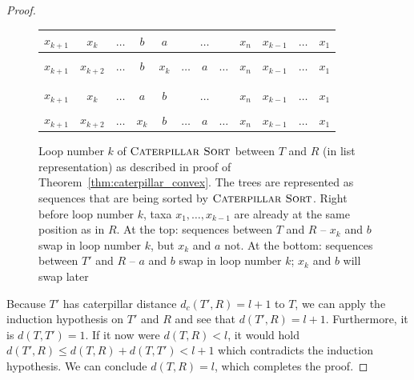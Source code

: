 \documentclass{amsart}
\newcommand{\csort}{\textsc{Caterpillar Sort}}
\begin{document}
\begin{proof}
    \begin{figure}[H]
    	\centering
        \begin{tabular}{|c|c|c|c|c|c|c|c|c|c|c|c|}
            \hline
            $x_{k+1}$ & $x_k$ & $\ldots$ & $b$ & $a$ & \multicolumn{3}{c|}{$\ldots$} & $x_n$ & $x_{k-1}$ & $\ldots$ & $x_1$\\
            \hline
            \multicolumn{12}{c}{}\\
            \hline
            $x_{k+1}$ & $x_{k+2}$ & $\ldots$ & $b$ & $x_k$ & $\ldots$ & $a$ & $\ldots$ & $x_n$ & $x_{k-1}$ & $\ldots$ & $x_1$\\
            \hline
            \multicolumn{12}{c}{}\\
            \multicolumn{12}{c}{}\\
            \hline
            $x_{k+1}$ & $x_k$ & $\ldots$ & $a$ & $b$ & \multicolumn{3}{c|}{$\ldots$} & $x_n$ & $x_{k-1}$ & $\ldots$ & $x_1$\\
            \hline
            \multicolumn{12}{c}{}\\
            \hline
            $x_{k+1}$ & $x_{k+2}$ & $\ldots$ & $x_k$ & $b$ & $\ldots$ & $a$ & $\ldots$ & $x_n$ & $x_{k-1}$ & $\ldots$ & $x_1$\\
            \hline
        \end{tabular}
        \vspace{2pt}
    	\caption{Loop number $k$ of $\csort$ between $T$ and $R$ (in list representation) as described in proof of Theorem~\ref{thm:caterpillar_convex}.
        The trees are represented as sequences that are being sorted by $\csort$.
        Right before loop number $k$, taxa $x_1, \ldots, x_{k-1}$ are already at the same position as in $R$.
        At the top: sequences between $T$ and $R$ -- $x_k$ and $b$ swap in loop number $k$, but $x_k$ and $a$ not.
        At the bottom: sequences between $T'$ and $R$ -- $a$ and $b$ swap in loop number $k$; $x_k$ and $b$ will swap later}
    	\label{fig:cat_convex_seq_example}
    \end{figure}

    Because $T'$ has caterpillar distance $d_c(T',R) = l+1$ to $T$, we can apply the induction hypothesis on $T'$ and $R$ and see that $d(T',R) = l+1$.
    Furthermore, it is $d(T,T') = 1$.
    If it now were $d(T,R) < l$, it would hold $d(T',R) \leq d(T,R) + d(T,T') < l + 1$ which contradicts the induction hypothesis.
    We can conclude $d(T,R) = l$, which completes the proof.
\end{proof}
\end{document}
